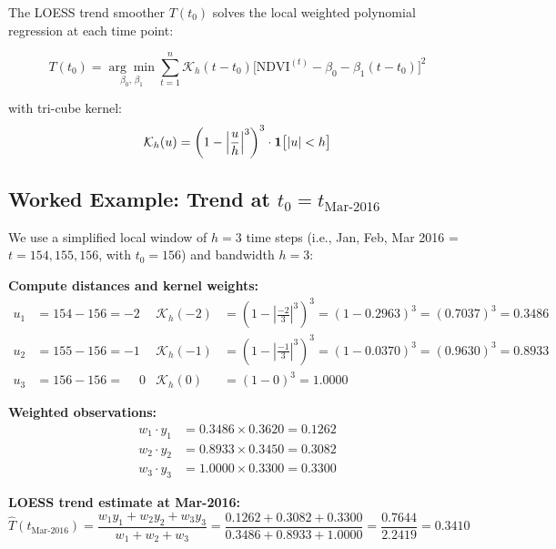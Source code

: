 \documentclass[12pt, a4paper]{article}
\begin{document}
The LOESS trend smoother $T(t_0)$ solves the local weighted
polynomial regression at each time point:

\begin{equation}
  T(t_0) =
  \underset{\beta_0,\,\beta_1}{\arg\min}
  \sum_{t=1}^{n}
  \mathcal{K}_h(t - t_0)
  \bigl[\mathrm{NDVI}^{(t)} - \beta_0 - \beta_1(t-t_0)\bigr]^2
  \label{eq:loess_obj}
\end{equation}

with tri-cube kernel:
\begin{equation}
  \mathcal{K}_h(u) =
  \biggl(1 - \Bigl|\frac{u}{h}\Bigr|^3\biggr)^3
  \cdot \mathbf{1}\bigl[|u| < h\bigr]
  \label{eq:tricube}
\end{equation}

\subsection{Worked Example: Trend at $t_0 = t_{\text{Mar-2016}}$}

We use a simplified local window of $h = 3$ time steps
(i.e., Jan, Feb, Mar 2016 = $t = 154, 155, 156$, with
$t_0 = 156$) and bandwidth $h = 3$:

\textbf{Compute distances and kernel weights:}
\begin{align}
u_1 &= 154 - 156 = -2 &
  \mathcal{K}_h(-2) &=
  \left(1 - \left|\tfrac{-2}{3}\right|^3\right)^3
  = \left(1 - 0.2963\right)^3
  = (0.7037)^3 = 0.3486
  \label{eq:k1}\\[4pt]
u_2 &= 155 - 156 = -1 &
  \mathcal{K}_h(-1) &=
  \left(1 - \left|\tfrac{-1}{3}\right|^3\right)^3
  = \left(1 - 0.0370\right)^3
  = (0.9630)^3 = 0.8933
  \label{eq:k2}\\[4pt]
u_3 &= 156 - 156 = \phantom{-}0 &
  \mathcal{K}_h(0)  &=
  \left(1 - 0\right)^3 = 1.0000
  \label{eq:k3}
\end{align}

\textbf{Weighted observations:}
\begin{align}
  w_1 \cdot y_1 &= 0.3486 \times 0.3620 = 0.1262 \label{eq:wy1}\\
  w_2 \cdot y_2 &= 0.8933 \times 0.3450 = 0.3082 \label{eq:wy2}\\
  w_3 \cdot y_3 &= 1.0000 \times 0.3300 = 0.3300 \label{eq:wy3}
\end{align}

\textbf{LOESS trend estimate at Mar-2016:}
\begin{equation}
  \hat{T}(t_{\text{Mar-2016}}) =
  \frac{w_1 y_1 + w_2 y_2 + w_3 y_3}{w_1 + w_2 + w_3}
  = \frac{0.1262 + 0.3082 + 0.3300}{0.3486 + 0.8933 + 1.0000}
  = \frac{0.7644}{2.2419}
  = \boxed{0.3410}
  \label{eq:trend_mar16}
\end{equation}
\end{document}
